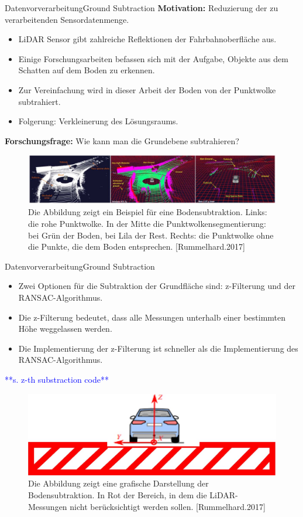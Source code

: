 \documentclass[169, handout	]{THIbeamer} %
\begin{document}
	\begin{frame}{Datenvorverarbeitung}{Ground Subtraction}
		\footnotesize
		\textbf{Motivation:} Reduzierung der zu verarbeitenden Sensordatenmenge.
		\begin{itemize}
			\item LiDAR Sensor gibt zahlreiche Reflektionen der Fahrbahnoberfläche aus.
			\item Einige Forschungsarbeiten befassen sich mit der Aufgabe, Objekte aus dem Schatten auf dem Boden zu erkennen.\\
			\item Zur Vereinfachung wird in dieser Arbeit der Boden von der Punktwolke subtrahiert. 
			\item Folgerung: Verkleinerung des Lösungsraums.		
		\end{itemize}	
	\textbf{Forschungsfrage:} Wie kann man die Grundebene subtrahieren? 
		\begin{figure}
			\includegraphics[scale=0.33]{required/Ground Subtraction.jpg}
			\caption{Die Abbildung zeigt ein Beispiel für eine Bodensubtraktion. Links: die rohe Punktwolke. In der Mitte die Punktwolkensegmentierung: bei Grün der Boden, bei Lila der Rest. Rechts: die Punktwolke ohne die Punkte, die dem Boden entsprechen. [Rummelhard.2017]}
        	\label{Ground Subtraction}
       	\end{figure}
	\end{frame}
	\begin{frame}{Datenvorverarbeitung}{Ground Subtraction}
		\begin{itemize}
			\item Zwei Optionen für die Subtraktion der Grundfläche sind: z-Filterung und der RANSAC-Algorithmus.
			\item Die z-Filterung bedeutet, dass alle Messungen unterhalb einer bestimmten Höhe weggelassen werden.
			\item Die Implementierung der z-Filterung ist schneller als die Implementierung des RANSAC-Algorithmus.
		\end{itemize}
	\textcolor{blue}{**s. z-th substraction code**}
		\begin{figure}
			\includegraphics[scale=0.5]{required/Ground Subtraction Implementierung.jpg} 
			\caption{Die Abbildung zeigt eine grafische Darstellung der Bodensubtraktion. In Rot der Bereich, in dem die LiDAR-Messungen nicht berücksichtigt werden sollen. [Rummelhard.2017]}
		\end{figure}
	\end{frame}
\end{document}
